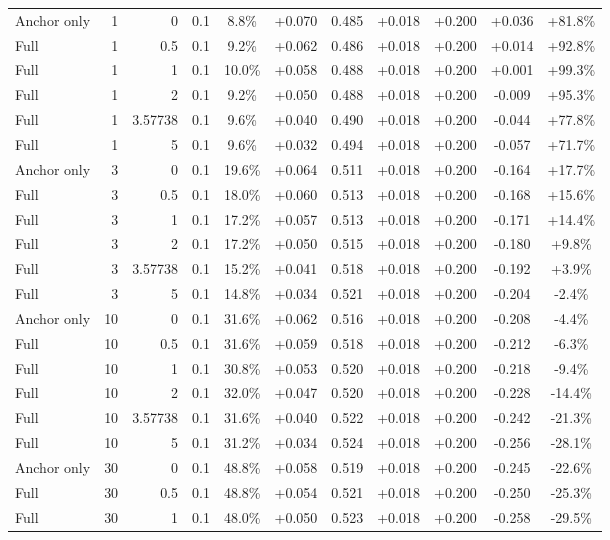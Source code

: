 \begin{table}[htbp]
\begin{tabular}{lrrrccccccc}
Anchor only & 1 & 0 & 0.1 & 8.8\% & +0.070 & 0.485 & +0.018 & +0.200 & +0.036 & +81.8\% \\
Full & 1 & 0.5 & 0.1 & 9.2\% & +0.062 & 0.486 & +0.018 & +0.200 & +0.014 & +92.8\% \\
Full & 1 & 1 & 0.1 & 10.0\% & +0.058 & 0.488 & +0.018 & +0.200 & +0.001 & +99.3\% \\
Full & 1 & 2 & 0.1 & 9.2\% & +0.050 & 0.488 & +0.018 & +0.200 & -0.009 & +95.3\% \\
Full & 1 & 3.57738 & 0.1 & 9.6\% & +0.040 & 0.490 & +0.018 & +0.200 & -0.044 & +77.8\% \\
Full & 1 & 5 & 0.1 & 9.6\% & +0.032 & 0.494 & +0.018 & +0.200 & -0.057 & +71.7\% \\
Anchor only & 3 & 0 & 0.1 & 19.6\% & +0.064 & 0.511 & +0.018 & +0.200 & -0.164 & +17.7\% \\
Full & 3 & 0.5 & 0.1 & 18.0\% & +0.060 & 0.513 & +0.018 & +0.200 & -0.168 & +15.6\% \\
Full & 3 & 1 & 0.1 & 17.2\% & +0.057 & 0.513 & +0.018 & +0.200 & -0.171 & +14.4\% \\
Full & 3 & 2 & 0.1 & 17.2\% & +0.050 & 0.515 & +0.018 & +0.200 & -0.180 & +9.8\% \\
Full & 3 & 3.57738 & 0.1 & 15.2\% & +0.041 & 0.518 & +0.018 & +0.200 & -0.192 & +3.9\% \\
Full & 3 & 5 & 0.1 & 14.8\% & +0.034 & 0.521 & +0.018 & +0.200 & -0.204 & -2.4\% \\
Anchor only & 10 & 0 & 0.1 & 31.6\% & +0.062 & 0.516 & +0.018 & +0.200 & -0.208 & -4.4\% \\
Full & 10 & 0.5 & 0.1 & 31.6\% & +0.059 & 0.518 & +0.018 & +0.200 & -0.212 & -6.3\% \\
Full & 10 & 1 & 0.1 & 30.8\% & +0.053 & 0.520 & +0.018 & +0.200 & -0.218 & -9.4\% \\
Full & 10 & 2 & 0.1 & 32.0\% & +0.047 & 0.520 & +0.018 & +0.200 & -0.228 & -14.4\% \\
Full & 10 & 3.57738 & 0.1 & 31.6\% & +0.040 & 0.522 & +0.018 & +0.200 & -0.242 & -21.3\% \\
Full & 10 & 5 & 0.1 & 31.2\% & +0.034 & 0.524 & +0.018 & +0.200 & -0.256 & -28.1\% \\
Anchor only & 30 & 0 & 0.1 & 48.8\% & +0.058 & 0.519 & +0.018 & +0.200 & -0.245 & -22.6\% \\
Full & 30 & 0.5 & 0.1 & 48.8\% & +0.054 & 0.521 & +0.018 & +0.200 & -0.250 & -25.3\% \\
Full & 30 & 1 & 0.1 & 48.0\% & +0.050 & 0.523 & +0.018 & +0.200 & -0.258 & -29.5\% \\

\end{tabular}
\end{table}
